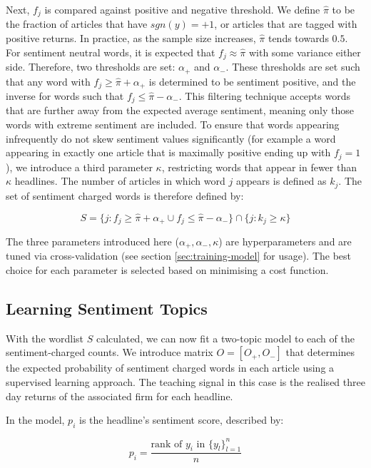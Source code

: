 Next, $f_j$ is compared against positive and negative threshold. We define $\hat \pi$ to be the fraction of articles that have $sgn(y) = +1$, or articles that are tagged with positive returns. In practice, as the sample size increases, $\hat \pi$ tends towards $0.5$. For sentiment neutral words, it is expected that $f_j \approx \hat \pi$ with some variance either side. Therefore, two thresholds are set: $\alpha_+$ and $\alpha_-$. These thresholds are set such that any word with $f_j \ge \hat \pi + \alpha_+$ is determined to be sentiment positive, and the inverse for words such that $f_j \le \hat \pi - \alpha_-$. This filtering technique accepts words that are further away from the expected average sentiment, meaning only those words with extreme sentiment are included. To ensure that words appearing infrequently do not skew sentiment values significantly (for example a word appearing in exactly one article that is maximally positive ending up with $f_j = 1$), we introduce a third parameter $\kappa$, restricting words that appear in fewer than $\kappa$ headlines. The number of articles in which word $j$ appears is defined as $k_j$. The set of sentiment charged words is therefore defined by:

\begin{equation}
S = \{j : f_j \ge \hat \pi + \alpha_+ \cup f_j \le \hat \pi - \alpha_- \} \cap  \{ j : k_j \ge \kappa \}
\end{equation}

\noindent
The three parameters introduced here ($\alpha_+, \alpha_-, \kappa$) are hyperparameters and are tuned via cross-validation (see section \ref{sec:training-model} for usage). The best choice for each parameter is selected based on minimising a cost function.

\subsection{Learning Sentiment Topics}
\label{learn-sentiment}
With the wordlist $S$ calculated, we can now fit a two-topic model to each of the sentiment-charged counts. We introduce matrix $O = [O_+,O_-]$ that determines the expected probability of sentiment charged words in each article using a supervised learning approach. The teaching signal in this case is the realised three day returns of the associated firm for each headline.

In the model, $p_i$ is the headline's sentiment score, described by:

\begin{equation}
p_i = \frac{\text{rank of } y_i \text{ in } \{y_l\}_{l=1}^n}{n}
\label{sentiment}
\end{equation}

